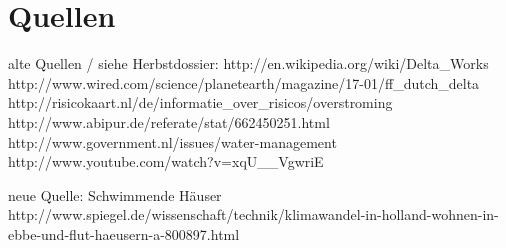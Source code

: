 \part{Quellen}

alte Quellen  / siehe Herbstdossier:
http://en.wikipedia.org/wiki/Delta_Works
http://www.wired.com/science/planetearth/magazine/17-01/ff_dutch_delta
http://risicokaart.nl/de/informatie_over_risicos/overstroming
http://www.abipur.de/referate/stat/662450251.html
http://www.government.nl/issues/water-management
http://www.youtube.com/watch?v=xqU__VgwriE

neue Quelle:
Schwimmende Häuser
http://www.spiegel.de/wissenschaft/technik/klimawandel-in-holland-wohnen-in-ebbe-und-flut-haeusern-a-800897.html


